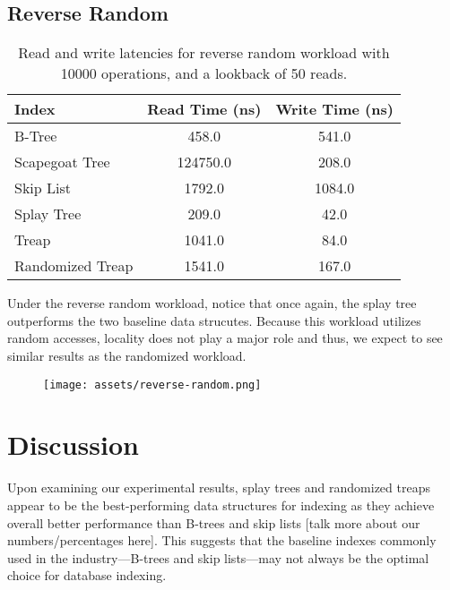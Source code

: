 \documentclass[sigconf]{acmart}
\begin{document}
\subsection{Reverse Random}
\begin{center}
  \begin{table}[H]
    \begin{tabular}{|l|c|c|}
      \hline
      \bf{Index} & \bf{Read Time (ns)} & \bf{Write Time (ns)} \\
      \hline
      B-Tree&458.0&541.0\\
      \hline
      Scapegoat Tree&124750.0&208.0\\
      \hline
      Skip List&1792.0&1084.0\\
      \hline
      Splay Tree&209.0&42.0\\
      \hline
      Treap&1041.0&84.0\\
      \hline
      Randomized Treap&1541.0&167.0\\
      \hline

    \end{tabular}
    \caption{Read and write latencies for reverse random workload with 10000 operations, and a lookback of 50 reads.}
  \end{table}
\end{center}

Under the reverse random workload, notice that once again, the splay tree outperforms the two baseline data strucutes. Because this workload utilizes random accesses, locality does not play a major role and thus, we expect to see similar results as the randomized workload.

\begin{center}

\begin{figure}[H]
    \texttt{[image: assets/reverse-random.png]}
\end{figure}
\end{center}
\newpage

\section{Discussion}
Upon examining our experimental results, splay trees and randomized treaps appear to be the best-performing data structures for indexing as they achieve overall better performance than B-trees and skip lists [talk more about our numbers/percentages here]. This suggests that the baseline indexes commonly used in the industry---B-trees and skip lists---may not always be the optimal choice for database indexing.
\end{document}
